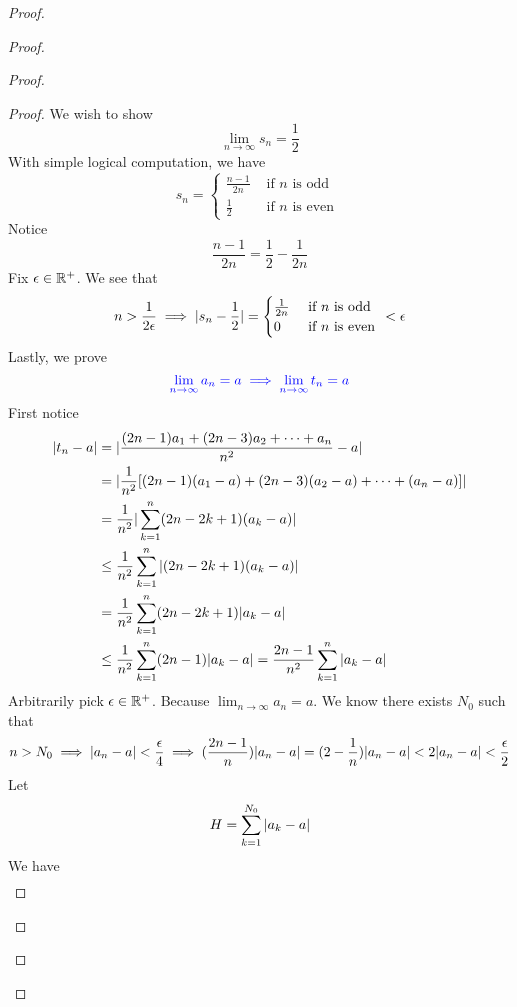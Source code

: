 \documentclass{report}
\begin{document}
\begin{proof}
\begin{proof}
\begin{proof}
\begin{proof}
We wish to show 
\begin{equation}
\lim_{n\to\infty}s_n=\frac{1}{2}
\end{equation}
With simple logical computation, we have
\begin{equation}
s_n=\begin{cases}
  \frac{n-1}{2n}& \text{ if $n$ is odd }\\
  \frac{1}{2}& \text{ if $n$ is even }
\end{cases}
\end{equation}
Notice 
\begin{equation}
\frac{n-1}{2n}=\frac{1}{2}-\frac{1}{2n}
\end{equation}
Fix $\epsilon \in\mathbb{R}^+$. We see that 
\begin{equation}
n>\frac{1}{2\epsilon }\implies |s_n-\frac{1}{2}|=\begin{cases}
\frac{1}{2n}& \text{ if $n$ is odd }\\
 0& \text{ if $n$ is even } 
\end{cases}<\epsilon 
\end{equation}
Lastly, we prove 
\begin{equation}
\textcolor{blue}{\lim_{n\to\infty}a_n=a\implies \lim_{n\to\infty}t_n=a}
\end{equation}
First notice
\begin{align}
  |t_n-a|&=|\frac{(2n-1)a_1+(2n-3)a_2+\cdots + a_n}{n^2}-a|\\
&=|\frac{1}{n^2}[(2n-1)(a_1-a)+(2n-3)(a_2-a)+\cdots +(a_n-a)]|\\
&=\frac{1}{n^2}|\sum_{k=1}^n (2n-2k+1)(a_k -a)|\\
&\leq \frac{1}{n^2}\sum_{k=1}^n |(2n-2k+1)(a_k-a)|\\
&= \frac{1}{n^2}\sum_{k=1}^n (2n-2k+1)|a_k-a|\\
&\leq \frac{1}{n^2}\sum_{k=1}^n (2n-1)|a_k-a|=\frac{2n-1}{n^2}\sum_{k=1}^n |a_k-a|
\end{align}
Arbitrarily pick $\epsilon \in\mathbb{R}^+$. Because $\lim_{n\to\infty}a_n=a$. We know there exists $N_0$ such that
 \begin{equation}
n>N_0\implies |a_n-a|<\frac{\epsilon }{4}\implies (\frac{2n-1}{n})|a_n-a|=(2-\frac{1}{n})|a_n-a|<2|a_n-a|<\frac{\epsilon}{2} 
\end{equation}
Let
\begin{equation}
H=\sum_{k=1}^{N_0} |a_k-a|
\end{equation}
We have
\begin{align}

\end{align}
\end{proof}
\end{proof}
\end{proof}
\end{proof}
\end{document}

